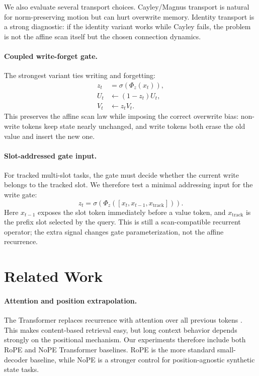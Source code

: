 \documentclass[10pt]{article}
\begin{document}
We also evaluate several transport choices. Cayley/Magnus transport is natural
for norm-preserving motion but can hurt overwrite memory. Identity transport is
a strong diagnostic: if the identity variant works while Cayley fails, the
problem is not the affine scan itself but the chosen connection dynamics.

\paragraph{Coupled write-forget gate.}
The strongest variant ties writing and forgetting:
\begin{align}
    z_t &= \sigma(\Phi_z(x_t)), \\
    U_t &\leftarrow (1-z_t) U_t, \\
    V_t &\leftarrow z_t V_t.
\end{align}
This preserves the affine scan law while imposing the correct overwrite bias:
non-write tokens keep state nearly unchanged, and write tokens both erase the
old value and insert the new one.

\paragraph{Slot-addressed gate input.}
For tracked multi-slot tasks, the gate must decide whether the current write
belongs to the tracked slot. We therefore test a minimal addressing input for
the write gate:
\[
    z_t = \sigma(\Phi_z([x_t, x_{t-1}, x_{\mathrm{track}}])).
\]
Here $x_{t-1}$ exposes the slot token immediately before a value token, and
$x_{\mathrm{track}}$ is the prefix slot selected by the query. This is still a
scan-compatible recurrent operator; the extra signal changes gate
parameterization, not the affine recurrence.

\section{Related Work}

\paragraph{Attention and position extrapolation.}
The Transformer replaces recurrence with attention over all previous tokens
\cite{vaswani2017attention}. This makes content-based retrieval easy, but long
context behavior depends strongly on the positional mechanism. Our experiments
therefore include both RoPE and NoPE Transformer baselines. RoPE is the more
standard small-decoder baseline, while NoPE is a stronger control for
position-agnostic synthetic state tasks.
\end{document}
